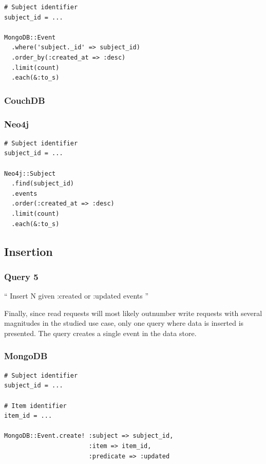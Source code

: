 \begin{verbatim}
# Subject identifier
subject_id = ...

MongoDB::Event
  .where('subject._id' => subject_id)
  .order_by(:created_at => :desc)
  .limit(count)
  .each(&:to_s)
\end{verbatim}

\subsubsection*{CouchDB}


\subsubsection*{Neo4j}

\begin{verbatim}
# Subject identifier
subject_id = ...

Neo4j::Subject
  .find(subject_id)
  .events
  .order(:created_at => :desc)
  .limit(count)
  .each(&:to_s)
\end{verbatim}

\subsection{Insertion}
\label{subsec:insertion}

\subsubsection{Query 5}
\label{subsubsec:query-5}

``
Insert N given :created or :updated events
''

Finally, since read requests will most likely outnumber write requests with several magnitudes in the studied use case, only one query where data is inserted is presented.
The query creates a single event in the data store.

\subsubsection*{MongoDB}

\begin{verbatim}
# Subject identifier
subject_id = ...

# Item identifier
item_id = ...

MongoDB::Event.create! :subject => subject_id,
                       :item => item_id,
                       :predicate => :updated
\end{verbatim}

